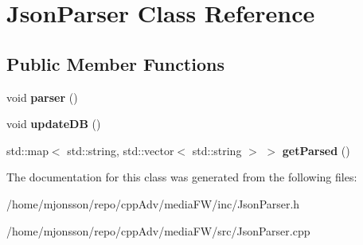 \hypertarget{classJsonParser}{}\section{Json\+Parser Class Reference}
\label{classJsonParser}
\subsection*{Public Member Functions}
\begin{DoxyCompactItemize}
\item 
\mbox{\label{classJsonParser_a0596a13bfbe4ad3a3148da5e15d6d5ca}} 
void {\bfseries parser} ()
\item 
\mbox{\label{classJsonParser_a5b1b7ec9ecee0e8e9368341764ceb91a}} 
void {\bfseries update\+DB} ()
\item 
\mbox{\label{classJsonParser_a3edea04b709d78da9b90a916ab1123f6}} 
std\+::map$<$ std\+::string, std\+::vector$<$ std\+::string $>$ $>$ {\bfseries get\+Parsed} ()
\end{DoxyCompactItemize}


The documentation for this class was generated from the following files\+:\begin{DoxyCompactItemize}
\item 
/home/mjonsson/repo/cpp\+Adv/media\+F\+W/inc/Json\+Parser.\+h\item 
/home/mjonsson/repo/cpp\+Adv/media\+F\+W/src/Json\+Parser.\+cpp\end{DoxyCompactItemize}
